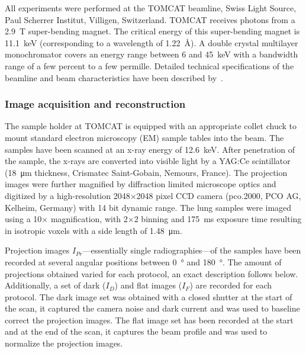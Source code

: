 All experiments were performed at the TOMCAT beamline, Swiss Light Source, Paul Scherrer Institut, Villigen, Switzerland. %
TOMCAT receives photons from a \SI{2.9}{\tesla} super-bending magnet. The critical energy of this super-bending magnet is \SI{11.1}{\kilo\electronvolt} (corresponding to a wavelength of \SI{1.22}{\angstrom}). A double crystal multilayer monochromator covers an energy range between 6 and \SI{45}{\kilo\electronvolt} with a bandwidth range of a few percent to a few permille. Detailed technical specifications of the beamline and beam characteristics have been described by~\citet{Stampanoni2006a}.

\subsubsection{Image acquisition and reconstruction}
\label{seq:Image Acquisition}

The sample holder at TOMCAT is equipped with an appropriate collet chuck to mount standard electron microscopy (EM) sample tables into the beam. The samples have been scanned at an x-ray energy of \SI{12.6}{\kilo\electronvolt}. After penetration of the sample, the x-rays are converted into visible light by a YAG:Ce scintillator (\SI{18}{\micro\meter} thickness, Crismatec Saint-Gobain, Nemours, France). The projection images were further magnified by diffraction limited microscope optics and digitized by a high-resolution 2048$\times$2048 pixel CCD camera (pco.2000, PCO AG, Kelheim, Germany) with 14 bit dynamic range. %
The lung samples were imaged using a 10$\times$ magnification, with 2$\times$2 binning and \SI{175}{\milli\second} exposure time resulting in isotropic voxels with a side length of \SI{1.48}{\micro\meter}.

\cbstart
Projection images $I_{Pr}$---essentially single radiographies---of the samples have been recorded at several angular positions between \SI{0}{\degree} and \SI{180}{\degree}. The amount of projections obtained varied for each protocol, an exact description follows below. Additionally, a set of dark ($I_{D}$) and flat images ($I_{F}$) are recorded for each protocol. The dark image set was obtained with a closed shutter at the start of the scan, it captured the camera noise and dark current and was used to baseline correct the projection images. The flat image set has been recorded at the start and at the end of the scan, it captures the beam profile and was used to normalize the projection images.

